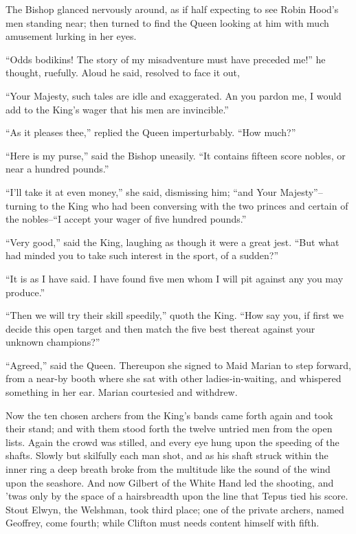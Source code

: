 The Bishop glanced nervously around, as if half expecting to see Robin
Hood's men standing near; then turned to find the Queen looking at him
with much amusement lurking in her eyes.

``Odds bodikins! The story of my misadventure must have preceded me!''
he thought, ruefully. Aloud he said, resolved to face it out,

``Your Majesty, such tales are idle and exaggerated. An you pardon me, I
would add to the King's wager that his men are invincible.''

``As it pleases thee,'' replied the Queen imperturbably. ``How much?''

``Here is my purse,'' said the Bishop uneasily. ``It contains fifteen
score nobles, or near a hundred pounds.''

``I'll take it at even money,'' she said, dismissing him; ``and Your
Majesty''--turning to the King who had been conversing with the two
princes and certain of the nobles--``I accept your wager of five hundred
pounds.''

``Very good,'' said the King, laughing as though it were a great jest.
``But what had minded you to take such interest in the sport, of a
sudden?''

``It is as I have said. I have found five men whom I will pit against
any you may produce.''

``Then we will try their skill speedily,'' quoth the King. ``How say
you, if first we decide this open target and then match the five best
thereat against your unknown champions?''

``Agreed,'' said the Queen. Thereupon she signed to Maid Marian to step
forward, from a near-by booth where she sat with other
ladies-in-waiting, and whispered something in her ear. Marian courtesied
and withdrew.

Now the ten chosen archers from the King's bands came forth again and
took their stand; and with them stood forth the twelve untried men from
the open lists. Again the crowd was stilled, and every eye hung upon the
speeding of the shafts. Slowly but skilfully each man shot, and as his
shaft struck within the inner ring a deep breath broke from the
multitude like the sound of the wind upon the seashore. And now Gilbert
of the White Hand led the shooting, and 'twas only by the space of a
hairsbreadth upon the line that Tepus tied his score. Stout Elwyn, the
Welshman, took third place; one of the private archers, named Geoffrey,
come fourth; while Clifton must needs content himself with fifth.

